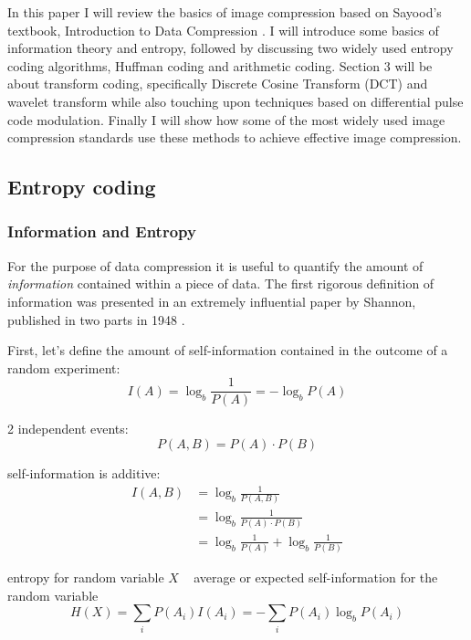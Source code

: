   In this paper I will review the basics of image compression based on Sayood's textbook, Introduction to Data Compression \cite{sayood_introduction_2012}. 
  I will introduce some basics of information theory and entropy, followed by discussing two widely used entropy coding algorithms, Huffman coding and arithmetic coding. Section 3 will be about transform coding, specifically Discrete Cosine Transform (DCT) and wavelet transform while also touching upon techniques based on differential pulse code modulation. Finally I will show how some of the most widely used image compression standards use these methods to achieve effective image compression.

  \subsection{Entropy coding}
    \subsubsection{Information and Entropy}
      For the purpose of data compression it is useful to quantify the amount of \textit{information} contained within a piece of data. The first rigorous definition of information was presented in an extremely influential paper by Shannon, published in two parts in 1948 \cite{shannon_mathematical_1948, shannon_mathematical_1948-1}.

      First, let's define the amount of self-information contained in the outcome of a random experiment:
      \begin{equation}
        I(A) = \log_b \frac{1}{P(A)} = - \log_b P(A)
      \end{equation}

      2 independent events:
      \begin{equation}
        P(A,B) = P(A) \cdot P(B)
      \end{equation}

      self-information is additive:
      \begin{align}
        I(A,B) &= \log_b \frac{1}{P(A,B)} \\
        &= \log_b \frac{1}{P(A) \cdot P(B)} \\
        &= \log_b \frac{1}{P(A)} + \log_b \frac{1}{P(B)}
      \end{align}

      entropy for random variable $X$ ~ average or expected self-information for the random variable
      \begin{equation}
        H(X) = \sum_i P(A_i)I(A_i) = - \sum_i P(A_i) \log_b P(A_i)
      \end{equation}

